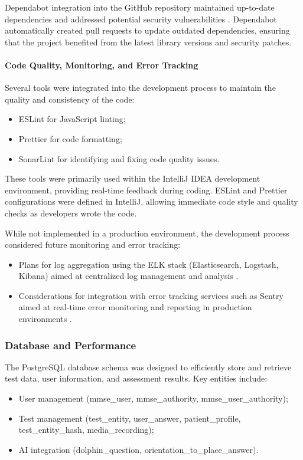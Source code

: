 Dependabot integration into the GitHub repository maintained up-to-date dependencies and addressed potential security vulnerabilities \cite{dependabot}. Dependabot automatically created pull requests to update outdated dependencies, ensuring that the project benefited from the latest library versions and security patches.

\paragraph{Code Quality, Monitoring, and Error Tracking}
Several tools were integrated into the development process to maintain the quality and consistency of the code:
\begin{itemize}
\item ESLint for JavaScript linting;
\item Prettier for code formatting;
\item SonarLint for identifying and fixing code quality issues.
\end{itemize}

These tools were primarily used within the IntelliJ IDEA development environment, providing real-time feedback during coding. ESLint and Prettier configurations were defined in IntelliJ, allowing immediate code style and quality checks as developers wrote the code.

While not implemented in a production environment, the development process considered future monitoring and error tracking:
\begin{itemize}
\item Plans for log aggregation using the ELK stack (Elasticsearch, Logstash, Kibana) aimed at centralized log management and analysis \cite{elk}.
\item Considerations for integration with error tracking services such as Sentry aimed at real-time error monitoring and reporting in production environments \cite{sentry}.
\end{itemize}

\subsubsection{Database and Performance}
The PostgreSQL database schema was designed to efficiently store and retrieve test data, user information, and assessment results. Key entities include:
\begin{itemize}
    \item User management (mmse\_user, mmse\_authority, mmse\_user\_authority);
    \item Test management (test\_entity, user\_answer, patient\_profile, test\_entity\_hash, media\_recording);
    \item AI integration (dolphin\_question, orientation\_to\_place\_answer).
\end{itemize}

